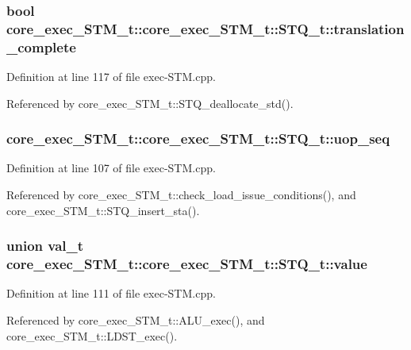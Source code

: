 \subsubsection[{translation\_\-complete}]{\setlength{\rightskip}{0pt plus 5cm}bool core\_\-exec\_\-STM\_\-t::core\_\-exec\_\-STM\_\-t::STQ\_\-t::translation\_\-complete}\label{structcore__exec__STM__t_1_1STQ__t_609c1339c45518710c56a60e898fe61f}




Definition at line 117 of file exec-STM.cpp.

Referenced by core\_\-exec\_\-STM\_\-t::STQ\_\-deallocate\_\-std().
\subsubsection[{uop\_\-seq}]{ core\_\-exec\_\-STM\_\-t::core\_\-exec\_\-STM\_\-t::STQ\_\-t::uop\_\-seq}\label{structcore__exec__STM__t_1_1STQ__t_17f3481271581bcbccff747e9dcdff73}




Definition at line 107 of file exec-STM.cpp.

Referenced by core\_\-exec\_\-STM\_\-t::check\_\-load\_\-issue\_\-conditions(), and core\_\-exec\_\-STM\_\-t::STQ\_\-insert\_\-sta().
\subsubsection[{value}]{\setlength{\rightskip}{0pt plus 5cm}union {\bf val\_\-t} core\_\-exec\_\-STM\_\-t::core\_\-exec\_\-STM\_\-t::STQ\_\-t::value\hspace{0.3cm}{\tt  [write]}}\label{structcore__exec__STM__t_1_1STQ__t_e773ce2e14edbd03b4f976d02d0441f4}




Definition at line 111 of file exec-STM.cpp.

Referenced by core\_\-exec\_\-STM\_\-t::ALU\_\-exec(), and core\_\-exec\_\-STM\_\-t::LDST\_\-exec().
